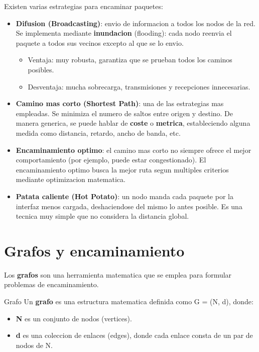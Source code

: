 Existen varias estrategias para encaminar paquetes:

\begin{itemize}
    \item \textbf{Difusion (Broadcasting)}: envio de informacion a todos los nodos de la
    red. Se implementa mediante \textbf{inundacion} (flooding): cada nodo reenvia el
    paquete a todos sus vecinos excepto al que se lo envio.
    \begin{itemize}
        \item Ventaja: muy robusta, garantiza que se prueban todos los caminos posibles.
        \item Desventaja: mucha sobrecarga, transmisiones y recepciones innecesarias.
    \end{itemize}
    \item \textbf{Camino mas corto (Shortest Path)}: una de las estrategias mas empleadas.
    Se minimiza el numero de saltos entre origen y destino. De manera generica,
    se puede hablar de \textbf{coste} o \textbf{metrica}, estableciendo alguna medida como
    distancia, retardo, ancho de banda, etc.
    \item \textbf{Encaminamiento optimo}: el camino mas corto no siempre ofrece el mejor
    comportamiento (por ejemplo, puede estar congestionado). El encaminamiento
    optimo busca la mejor ruta segun multiples criterios mediante optimizacion
    matematica.
    \item \textbf{Patata caliente (Hot Potato)}: un nodo manda cada paquete por la interfaz
    menos cargada, deshaciendose del mismo lo antes posible. Es una tecnica muy
    simple que no considera la distancia global.
\end{itemize}


\section{Grafos y encaminamiento}

Los \textbf{grafos} son una herramienta matematica que se emplea para formular
problemas de encaminamiento.

\begin{definicion}{Grafo}
Un \textbf{grafo} es una estructura matematica definida como G = (N, d), donde:
\begin{itemize}
    \item \textbf{N} es un conjunto de nodos (vertices).
    \item \textbf{d} es una coleccion de enlaces (edges), donde cada enlace consta de un
    par de nodos de N.
\end{itemize}
\end{definicion}

